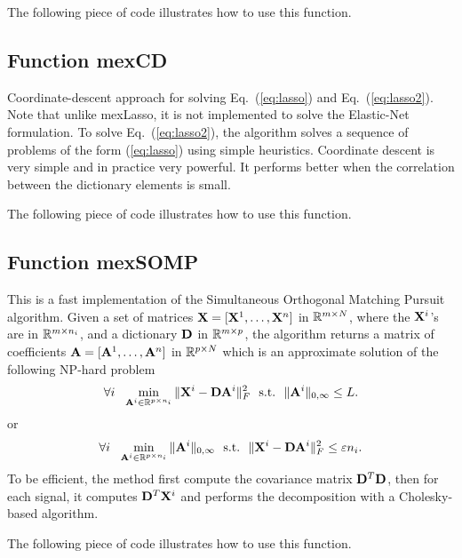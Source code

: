\documentclass[a4paper, 11pt]{article}
\begin{document}

The following piece of code illustrates how to use this function.


\subsection{Function mexCD}
Coordinate-descent approach for solving Eq.~(\ref{eq:lasso}) and
Eq.~(\ref{eq:lasso2}). Note that unlike mexLasso, it is not implemented to solve the Elastic-Net formulation.
To solve Eq.~(\ref{eq:lasso2}), the algorithm solves a
sequence of problems of the form (\ref{eq:lasso}) using simple heuristics.
Coordinate descent is very simple and in practice very powerful. It performs
better when the correlation between the dictionary elements is small.


The following piece of code illustrates how to use this function.


\subsection{Function mexSOMP}
This is a fast implementation of the Simultaneous Orthogonal Matching Pursuit algorithm. Given a set of matrices ${\mathbf X}=[{\mathbf X}^1,\ldots,{\mathbf X}^n]$  in ${\mathbb R}^{m \times N}$, where the ${\mathbf X}^i$'s are in ${\mathbb R}^{m \times n_i}$, and a dictionary ${\mathbf D}$ in ${\mathbb R}^{m \times p}$, the algorithm returns a matrix of coefficients ${\mathbf A}=[{\mathbf A}^1,\ldots,{\mathbf A}^n]$ in ${\mathbb R}^{p \times N}$ which is an approximate solution of the following NP-hard problem
\begin{equation}
\forall i~~ \min_{{\mathbf A}^i \in {\mathbb R}^{p \times n_i}} \|{\mathbf X}^i-{\mathbf D}{\mathbf A}^i\|_F^2 ~~\text{s.t.}~~ \|{\mathbf A}^i\|_{0,\infty} \leq L.
\end{equation}
or
\begin{equation}
\forall i~~ \min_{{\mathbf A}^i \in {\mathbb R}^{p \times n_i}}  \|{\mathbf A}^i\|_{0,\infty} ~~\text{s.t.}~~ \|{\mathbf X}^i-{\mathbf D}{\mathbf A}^i\|_F^2 \leq \varepsilon n_i.
\end{equation}
To be efficient, the method first compute the covariance matrix ${\mathbf D}^T{\mathbf D}$, then for each signal, it computes ${\mathbf D}^T{\mathbf X}^i$ and performs the decomposition with a Cholesky-based algorithm.


The following piece of code illustrates how to use this function.

\end{document}
